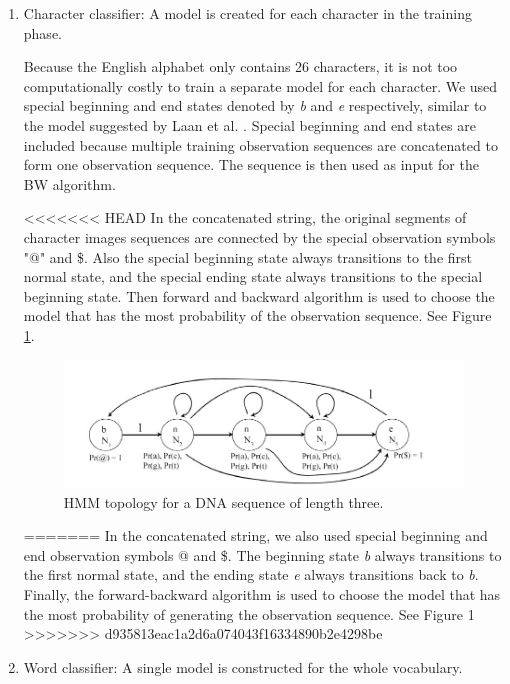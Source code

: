 \begin{enumerate}
\item	Character classifier: A model is created for each character in the training phase.

Because the English alphabet only contains 26 characters, it is not too computationally costly to train a separate model for each character.
We used special beginning and end states denoted by \textit{b} and \textit{e} respectively, similar to the model suggested by Laan et al. \cite{Laan}.
Special beginning and end states are included because multiple training observation sequences are concatenated to form one observation sequence.
The sequence is then used as input for the BW algorithm.

<<<<<<< HEAD
In the concatenated string, the original segments of character images sequences are connected by the special observation symbols "@" and \$.
 Also the special beginning state always transitions to the first normal state, and the special ending state always transitions to the special beginning state. Then forward and backward algorithm is used to choose the model that has the most probability of the observation sequence. See Figure \ref{figure:DNAHMM}\cite{Laan}.

\begin{figure}[!t]
  \centering
  \includegraphics[width=5in]{topolopy_for_training}
  \caption{HMM topology for a DNA sequence of length three.}
  \label{figure:DNAHMM}
\end{figure}
=======
In the concatenated string, we also used special beginning and end observation symbols @ and \$.
The  beginning state   \textit{b} always transitions to the first normal state, and the  ending state \textit{e} always transitions back to \textit{b}.
Finally, the forward-backward algorithm is used to choose the model that has the most probability of generating the observation sequence. 
See Figure 1
>>>>>>> d935813eac1a2d6a074043f16334890b2e4298be



\item	Word classifier: A single model is constructed for the whole vocabulary. 


\end{enumerate}
